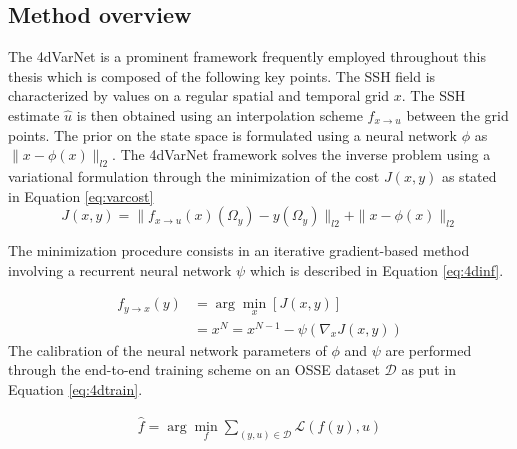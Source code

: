 \begin{bibunit}
\subsection*{Method overview}
The 4dVarNet is a prominent framework frequently employed throughout this thesis which is composed of the following key points.
The SSH field is characterized by values on a regular spatial and temporal grid $x$. The SSH estimate $\hat{u}$ is then obtained using an interpolation scheme $f_{x \to u}$ between the grid points. The prior on the state space is formulated using a neural network $\phi$ as $\|x - \phi(x)\|_{l2}$.
The 4dVarNet framework solves the inverse problem using a variational formulation through the minimization of the cost $J(x, y)$ as stated in  Equation \ref{eq:varcost} 
\begin{equation}
 J(x, y) = \|f_{x\to u}(x)(\Omega_y) - y(\Omega_y)\|_{l2} + \| x - \phi(x)\|_{l2}
    \label{eq:varcost}
  \end{equation}

The minimization procedure consists in an iterative gradient-based method involving a recurrent neural network $\psi$ which is described in Equation \ref{eq:4dinf}.


  \begin{equation}
  \begin{split}
 f_{y\to x}(y) &= \arg\min_x \left[J(x, y) \right] \\
 &= x^N = x^{N-1} - \psi( \nabla_x J(x, y) )
    \label{eq:4dinf}
    \end{split}
  \end{equation}
The calibration of the neural network parameters of $\phi$ and $\psi$ are performed through the end-to-end training scheme on an OSSE dataset $\mathcal{D}$ as put in  Equation \ref{eq:4dtrain}.

  
  \begin{equation}
  \begin{split}
 \hat{f} = \arg\min_f \sum_{(y, u) \in \mathcal{D}} \mathcal{L}(f(y), u)
 \end{split}
    \label{eq:4dtrain}
  \end{equation}



\end{bibunit}
